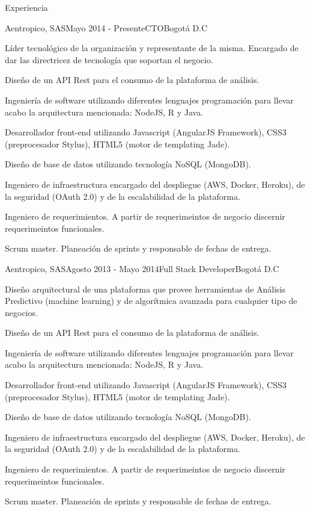 \documentclass[spanish]{resume} %
\begin{document}
\begin{rSection}{Experiencia}

\begin{rSubsection}{Aentropico, SAS}{Mayo 2014 - Presente}{CTO}{Bogot\'a D.C}
\item L\'ider tecnol\'ogico de la organizaci\'on y representante de la misma. Encargado de dar las directricez de tecnolog\'ia que soportan el negocio.
\item Dise\~no de un API Rest para el consumo de la plataforma de an\'alisis.
\item Ingenier\'ia de software utilizando diferentes lenguajes programaci\'on para llevar acabo la arquitectura mencionada: NodeJS, R y Java.
\item Desarrollador front-end utilizando Javascript (AngularJS Framework), CSS3 (preprocesador Stylus), HTML5 (motor de templating Jade).
\item Dise\~no de base de datos utilizando tecnología NoSQL (MongoDB).
\item Ingeniero de infraestructura encargado del despliegue (AWS, Docker, Heroku), de la seguridad (OAuth 2.0) y de la escalabilidad de la plataforma. 
\item Ingeniero de requerimientos. A partir de requerimeintos de negocio discernir requerimeintos funcionales.
\item Scrum master. Planeaci\'on de sprints y responsable de fechas de entrega.
\end{rSubsection}


\begin{rSubsection}{Aentropico, SAS}{Agosto 2013 - Mayo 2014}{Full Stack Developer}{Bogot\'a D.C}
\item Dise\~no arquitectural de una plataforma que provee herramientas de An\'alisis Predictivo (machine learning) y de algor\'itmica avanzada para cualquier tipo de negocios.
\item Dise\~no de un API Rest para el consumo de la plataforma de an\'alisis.
\item Ingenier\'ia de software utilizando diferentes lenguajes programaci\'on para llevar acabo la arquitectura mencionada: NodeJS, R y Java.
\item Desarrollador front-end utilizando Javascript (AngularJS Framework), CSS3 (preprocesador Stylus), HTML5 (motor de templating Jade).
\item Dise\~no de base de datos utilizando tecnolog\'ia NoSQL (MongoDB).
\item Ingeniero de infraestructura encargado del despliegue (AWS, Docker, Heroku), de la seguridad (OAuth 2.0) y de la escalabilidad de la plataforma. 
\item Ingeniero de requerimientos. A partir de requerimeintos de negocio discernir requerimeintos funcionales.
\item Scrum master. Planeaci\'on de sprints y responsable de fechas de entrega.
\end{rSubsection}


\end{rSection}
\end{document}

